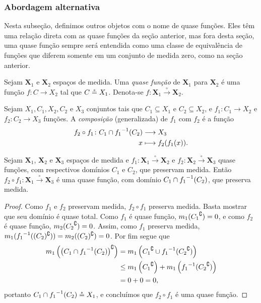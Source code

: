 \subsubsection{Abordagem alternativa}

Nesta subseção, definimos outros objetos com o nome de quase funções. Eles têm uma relação direta com as quase funções da seção anterior, mas fora desta seção, uma quase função sempre será entendida como uma classe de equivalência de funções que diferem somente em um conjunto de medida zero, como na seção anterior.

\begin{definition}
Sejam $\bm X_1$ e $\bm X_2$ espaços de medida. Uma \emph{quase função} de $\bm X_1$ para $\bm X_2$ é uma função $f\colon C \to X_2$ tal que $C \circeq X_1$. Denota-se $f\colon \bm X_1 \overset{\circ}{\to} \bm X_2$.
\end{definition}

\begin{definition}
Sejam $X_1,C_1,X_2,C_2$ e $X_3$ conjuntos tais que $C_1 \subseteq X_1$ e $C_2 \subseteq X_2$, e $f_1\colon C_1 \to X_2$ e $f_2\colon C_2 \to X_3$ funções. A \emph{composição} (generalizada) de $f_1$ com $f_2$ é a função
	\begin{align*}
	{f_2 \circ f_1}\colon {C_1 \cap {f_1}^{-1}(C_2)} &\longrightarrow {X_3} \\{x} &\longmapsto f_2(f_1(x)).
	\end{align*}
\end{definition}

\begin{proposition}
Sejam $\bm X_1$, $\bm X_2$ e $\bm X_3$ espaços de medida e $f_1\colon \bm X_1 \overset{\circ}{\to} \bm X_2$ e $f_2\colon \bm X_2 \overset{\circ}{\to} \bm X_3$ quase funções, com respectivos domínios $C_1$ e $C_2$, que preservam medida. Então $f_2 \circ f_1\colon \bm X_1 \overset{\circ}{\to} \bm X_3$ é uma quase função, com domínio $C_1 \cap {f_1}^{-1}(C_2)$, que preserva medida.
\end{proposition}
\begin{proof}
Como $f_1$ e $f_2$ preservam medida, $f_2 \circ f_1$ preserva medida. Basta mostrar que seu domínio é quase total. Como $f_1$ é quase função, $m_1({C_1}^\complement) = 0$, e como $f_2$ é quase função, $m_2({C_2}^\complement) = 0$. Assim, como $f_1$ preserva medida, $m_1({f_1}^{-1}((C_2)^\complement)) = m_2((C_2)^\complement)= 0$. Por fim segue que
	\begin{align*}
	m_1 \left(\left(C_1 \cap {f_1}^{-1}(C_2)\right)^\complement\right) &= m_1 \left({C_1}^\complement \cup {f_1}^{-1}({C_2}^\complement)\right) \\
		&\leq m_1 \left({C_1}^\complement\right ) + m_1 \left ({f_1}^{-1}({C_2}^\complement)\right) \\
		&= 0+0=0,
	\end{align*}
portanto $C_1 \cap {f_1}^{-1}(C_2) \circeq X_1$, e concluímos que $f_2 \circ f_1$ é uma quase função.
\end{proof}

